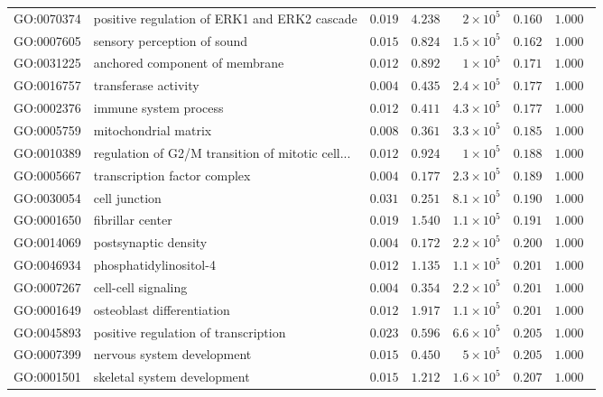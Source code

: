 \documentclass{article}
\begin{document}
\begin{center}
\begin{longtable*}{|l|l|r|r|r|r|r|}
            GO:0070374 & positive regulation of ERK1 and ERK2 cascade & $ 0.019$ & $ 4.238$ & $ 2\times 10^{5}$ & $ 0.160$ & $ 1.000~~$ \\
            GO:0007605 & sensory perception of sound & $ 0.015$ & $ 0.824$ & $1.5\times 10^{5}$ & $ 0.162$ & $ 1.000~~$ \\
            GO:0031225 & anchored component of membrane & $ 0.012$ & $ 0.892$ & $ 1\times 10^{5}$ & $ 0.171$ & $ 1.000~~$ \\
            GO:0016757 & transferase activity & $ 0.004$ & $ 0.435$ & $2.4\times 10^{5}$ & $ 0.177$ & $ 1.000~~$ \\
            GO:0002376 & immune system process & $ 0.012$ & $ 0.411$ & $4.3\times 10^{5}$ & $ 0.177$ & $ 1.000~~$ \\
            GO:0005759 & mitochondrial matrix & $ 0.008$ & $ 0.361$ & $3.3\times 10^{5}$ & $ 0.185$ & $ 1.000~~$ \\
            GO:0010389 & regulation of G2/M transition of mitotic cell... & $ 0.012$ & $ 0.924$ & $ 1\times 10^{5}$ & $ 0.188$ & $ 1.000~~$ \\
            GO:0005667 & transcription factor complex & $ 0.004$ & $ 0.177$ & $2.3\times 10^{5}$ & $ 0.189$ & $ 1.000~~$ \\
            GO:0030054 & cell junction & $ 0.031$ & $ 0.251$ & $8.1\times 10^{5}$ & $ 0.190$ & $ 1.000~~$ \\
            GO:0001650 & fibrillar center & $ 0.019$ & $ 1.540$ & $1.1\times 10^{5}$ & $ 0.191$ & $ 1.000~~$ \\
            GO:0014069 & postsynaptic density & $ 0.004$ & $ 0.172$ & $2.2\times 10^{5}$ & $ 0.200$ & $ 1.000~~$ \\
            GO:0046934 & phosphatidylinositol-4 & $ 0.012$ & $ 1.135$ & $1.1\times 10^{5}$ & $ 0.201$ & $ 1.000~~$ \\
            GO:0007267 & cell-cell signaling & $ 0.004$ & $ 0.354$ & $2.2\times 10^{5}$ & $ 0.201$ & $ 1.000~~$ \\
            GO:0001649 & osteoblast differentiation & $ 0.012$ & $ 1.917$ & $1.1\times 10^{5}$ & $ 0.201$ & $ 1.000~~$ \\
            GO:0045893 & positive regulation of transcription & $ 0.023$ & $ 0.596$ & $6.6\times 10^{5}$ & $ 0.205$ & $ 1.000~~$ \\
            GO:0007399 & nervous system development & $ 0.015$ & $ 0.450$ & $ 5\times 10^{5}$ & $ 0.205$ & $ 1.000~~$ \\
            GO:0001501 & skeletal system development & $ 0.015$ & $ 1.212$ & $1.6\times 10^{5}$ & $ 0.207$ & $ 1.000~~$ \\

\end{longtable*}
\end{center}
\end{document}
